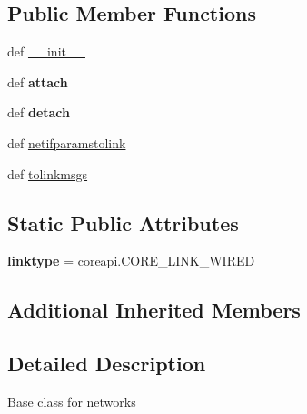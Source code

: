 \subsection*{Public Member Functions}
\begin{DoxyCompactItemize}
\item 
def \hyperlink{classcore_1_1coreobj_1_1_py_core_net_a9e104d00fc3fd445c46772684d59f367}{\+\_\+\+\_\+init\+\_\+\+\_\+}
\item 
\hypertarget{classcore_1_1coreobj_1_1_py_core_net_afcd0d2efe3e67603063c2dc1f93e2d2a}{def {\bfseries attach}}\label{classcore_1_1coreobj_1_1_py_core_net_afcd0d2efe3e67603063c2dc1f93e2d2a}

\item 
\hypertarget{classcore_1_1coreobj_1_1_py_core_net_a645128dfd774f4fc49c6c01c04f7f635}{def {\bfseries detach}}\label{classcore_1_1coreobj_1_1_py_core_net_a645128dfd774f4fc49c6c01c04f7f635}

\item 
def \hyperlink{classcore_1_1coreobj_1_1_py_core_net_a06d5cfab6956154cdd01e6f6797854ef}{netifparamstolink}
\item 
def \hyperlink{classcore_1_1coreobj_1_1_py_core_net_acb08c20f17af2e7904978a0f8eb42324}{tolinkmsgs}
\end{DoxyCompactItemize}
\subsection*{Static Public Attributes}
\begin{DoxyCompactItemize}
\item 
\hypertarget{classcore_1_1coreobj_1_1_py_core_net_a8dd90255ee972192da1a398acafad7d5}{{\bfseries linktype} = coreapi.\+C\+O\+R\+E\+\_\+\+L\+I\+N\+K\+\_\+\+W\+I\+R\+E\+D}\label{classcore_1_1coreobj_1_1_py_core_net_a8dd90255ee972192da1a398acafad7d5}

\end{DoxyCompactItemize}
\subsection*{Additional Inherited Members}


\subsection{Detailed Description}
\begin{DoxyVerb}Base class for networks
\end{DoxyVerb}
 

